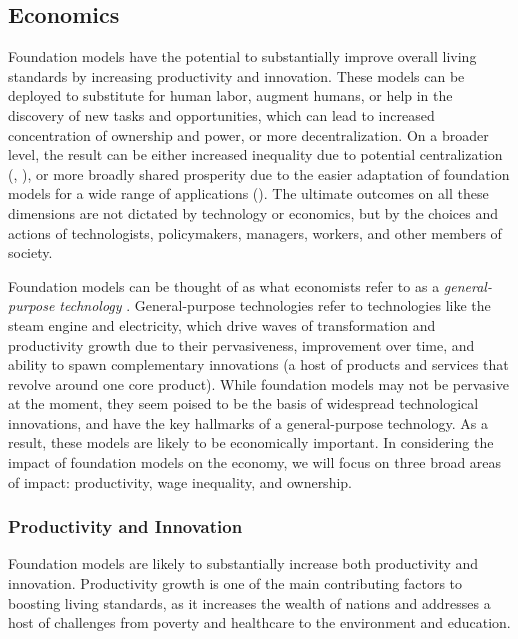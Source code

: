 \newsection
\subsection{Economics}
\label{sec:economics}

Foundation models have the potential to substantially improve overall living standards by increasing productivity and innovation. 
These models can be deployed to substitute for human labor, augment humans, or help in the discovery of new tasks and opportunities, 
which can lead to increased concentration of ownership and power, or more decentralization. 
On a broader level, the result can be either increased inequality due to potential centralization (, ), or more broadly shared prosperity due to the easier adaptation of foundation models for a wide range of applications ().
The ultimate outcomes on all these dimensions are not dictated by technology or economics, 
but by the choices and actions of technologists, policymakers, managers, workers, and other members of society.

Foundation models can be thought of as what economists refer to as a \emph{general-purpose technology} \citep{Bresnahan1995}. 
General-purpose technologies refer to technologies like the steam engine and electricity,
which drive waves of transformation and productivity growth due to their pervasiveness, improvement over time, and ability to spawn complementary innovations (a host of products and services that revolve around one core product). 
While foundation models may not be pervasive at the moment, they seem poised to be the basis of widespread technological innovations, 
and have the key hallmarks of a general-purpose technology.
As a result, these models are likely to be economically important.
In considering the impact of foundation models on the economy, 
we will focus on three broad areas of impact: productivity, wage inequality, and ownership.


\subsubsection{Productivity and Innovation}
Foundation models are likely to substantially increase both productivity and innovation. 
Productivity growth is one of the main contributing factors to boosting living standards, as it increases the wealth of nations and addresses a host of challenges from poverty and healthcare to the environment and education.

